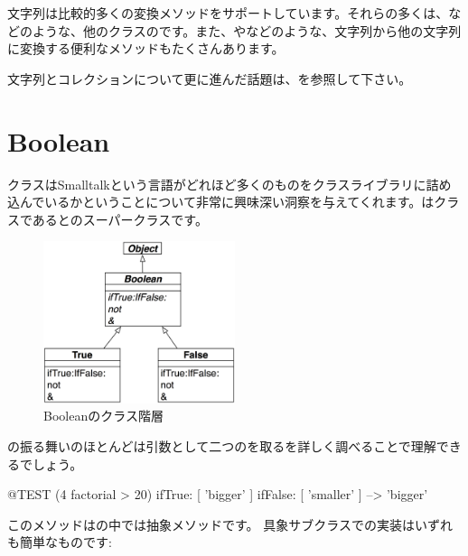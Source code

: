 \documentclass[a4paper,10pt,twoside]{book}
\begin{document}
文字列は比較的多くの変換メソッドをサポートしています。それらの多くは、などのような、他のクラスのです。また、やなどのような、文字列から他の文字列に変換する便利なメソッドもたくさんあります。

文字列とコレクションについて更に進んだ話題は、を参照して下さい。


\section{Boolean}

クラスはSmalltalkという言語がどれほど多くのものをクラスライブラリに詰め込んでいるかということについて非常に興味深い洞察を与えてくれます。はクラスであるとのスーパークラスです。

\begin{figure}[ht]
  {\centerline {\includegraphics[width=0.5\textwidth]{BooleanHierarchy}}}
\caption{Booleanのクラス階層 }
\end{figure}

の振る舞いのほとんどは引数として二つのを取るを詳しく調べることで理解できるでしょう。

\begin{code}{@TEST}
(4 factorial > 20) ifTrue: [ 'bigger' ] ifFalse: [ 'smaller' ] --> 'bigger'
\end{code}

このメソッドはの中では抽象メソッドです。
具象サブクラスでの実装はいずれも簡単なものです:
\end{document}
